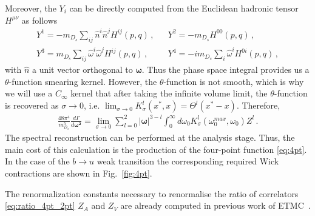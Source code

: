 Moreover, the $Y_i$ can be directly computed from the Euclidean
hadronic tensor $H^{\mu\nu}$ as follows
\begin{align}
                                                     & Y^1=-m_{D_s}\sum_{ij}\hat{n}^i\hat{n}^j H^{ij}(p,q)\,,          &  & Y^2=-m_{D_s}H^{00}(p,q)\,, \\
                                                     & Y^3=m_{D_s}\sum_{ij}\hat{\omega}^i\hat{\omega}^j H^{ij}(p,q)\,, &  &
  Y^4=-im_{D_s}\sum_{i}\hat{\omega}^i H^{0i}(p,q)\,, &
\end{align}
with $\hat{n}$ a unit vector orthogonal to $\bm\omega$.
Thus the phase space integral provides us a $\theta$-function smearing
kernel. However, the $\theta$-function is not smooth, which is why we
will use a $C_\infty$ kernel that
after taking the infinite volume limit, the
$\theta$-function is recovered as $\sigma\to0$, i.e. $\lim_{\sigma\to 0} K_\sigma^l(x^*,x)=\Theta^l(x^*-x)$.
Therefore,
\begin{gather}
  \frac{48 \pi^4}{m_{D_s}^5}\frac{d\Gamma}{d \bm{ \omega^2} }
  =\lim_{\sigma\to 0}\sum_{l=0}^2 |\bm{\omega}|^{3-l}\int_0^{\infty}d \omega_0 K_\sigma^l(\omega_0^{max},\omega_0) Z^l\,.
\end{gather}
The spectral reconstruction can be performed at the analysis stage. Thus,
the main cost of this calculation is the production of the
four-point function \eqref{eq:4pt}. In the case of the $b\to u$ weak
transition the corresponding required Wick contractions are shown in
Fig.~\ref{fig:4pt}.

The renormalization constants necessary to renormalise the ratio of
correlators \eqref{eq:ratio_4pt_2pt} $Z_A$ and $Z_V$ are already
computed in previous work of ETMC~\cite{ExtendedTwistedMass:2022jpw}.

